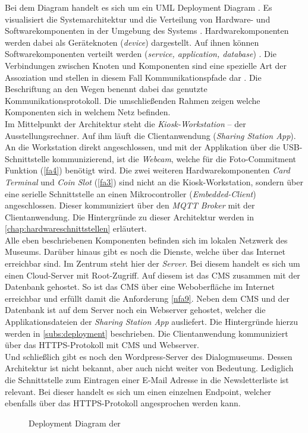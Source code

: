 Bei dem Diagram handelt es sich um ein UML Deployment Diagram \cite{uml-spec}. 
Es visualisiert die Systemarchitektur und die Verteilung von Hardware- und Softwarekomponenten in der 
Umgebung des Systems \cite{uml-2.5}. Hardwarekomponenten werden dabei als Geräteknoten
(\emph{device}) dargestellt. Auf ihnen können Softwarekomponenten verteilt werden (\emph{service,
application, database}) \cite{uml-diagrams, uml-2.5}. Die Verbindungen zwischen Knoten und Komponenten
sind eine spezielle Art der Assoziation und stellen in diesem Fall Kommunikationspfade dar \cite{uml-2.5}.
Die Beschriftung an den Wegen benennt dabei das genutzte Kommunikationsprotokoll.
Die umschließenden Rahmen zeigen welche Komponenten sich in welchem Netz befinden.\\
Im Mittelpunkt der Architektur steht die \emph{Kiosk-Workstation} -- der Ausstellungsrechner. Auf ihm läuft
die Clientanwendung (\emph{Sharing Station App}). An die Workstation direkt angeschlossen, und mit der
Applikation über die USB-Schnittstelle kommunizierend, ist die \emph{Webcam}, 
welche für die Foto-Commitment Funktion (\ref{fa4}) benötigt wird. 
Die zwei weiteren Hardwarekomponenten \emph{Card Terminal} und \emph{Coin Slot} (\ref{fa3}) sind nicht 
an die Kiosk-Workstation, sondern über eine serielle Schnittstelle an einen
Mikrocontroller (\emph{Embedded-Client}) angeschlossen. Dieser kommuniziert über
den \emph{MQTT Broker} mit der Clientanwendung. Die Hintergründe zu dieser Architektur werden in
\autoref{chap:hardwareschnittstellen} erläutert.\\
Alle eben beschriebenen Komponenten befinden sich im lokalen Netzwerk des Museums. Darüber hinaus gibt 
es noch die Dienste, welche über das Internet erreichbar sind. Im Zentrum steht hier der \emph{Server}. 
Bei diesem handelt es sich um einen Cloud-Server mit Root-Zugriff. Auf diesem ist das CMS zusammen mit
der Datenbank gehostet. So ist das CMS über eine Weboberfläche im Internet erreichbar und erfüllt
damit die Anforderung \ref{nfa9}. Neben dem CMS und der Datenbank ist auf dem Server noch ein
Webserver gehostet, welcher die Applikationsdateien der \emph{Sharing
Station App} ausliefert. Die Hintergründe hierzu werden in \autoref{subs:deployment} beschrieben.
Die Clientanwendung kommuniziert über das HTTPS-Protokoll mit CMS und Webserver.\\
Und schließlich gibt es noch den Wordpress-Server des Dialogmuseums. Dessen Architektur ist nicht bekannt,
aber auch nicht weiter von Bedeutung. Lediglich die Schnittstelle zum Eintragen einer E-Mail Adresse in 
die Newsletterliste ist relevant. Bei dieser handelt es sich um einen einzelnen Endpoint, welcher ebenfalls
über das HTTPS-Protokoll angesprochen werden kann. 

\begin{figure}
    \centering
    
    \caption{Deployment Diagram der \shst{}}
    \label{fig:ss-deployment-diagram}
\end{figure}